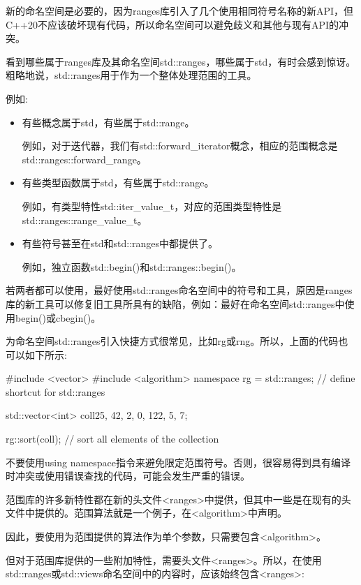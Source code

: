 新的命名空间是必要的，因为ranges库引入了几个使用相同符号名称的新API，但C++20不应该破坏现有代码，所以命名空间可以避免歧义和其他与现有API的冲突。

看到哪些属于ranges库及其命名空间std::ranges，哪些属于std，有时会感到惊讶。粗略地说，std::ranges用于作为一个整体处理范围的工具。

例如:

\begin{itemize}
\item
有些概念属于std，有些属于std::range。

例如，对于迭代器，我们有std::forward\_iterator概念，相应的范围概念是std::ranges::forward\_range。

\item
有些类型函数属于std，有些属于std::range。

例如，有类型特性std::iter\_value\_t，对应的范围类型特性是std::ranges::range\_value\_t。

\item
有些符号甚至在std和std::ranges中都提供了。

例如，独立函数std::begin()和std::ranges::begin()。
\end{itemize}

若两者都可以使用，最好使用std::ranges命名空间中的符号和工具，原因是ranges库的新工具可以修复旧工具所具有的缺陷，例如：最好在命名空间std::ranges中使用begin()或cbegin()。

为命名空间std::ranges引入快捷方式很常见，比如rg或rng。所以，上面的代码也可以如下所示:

\begin{cpp}
#include <vector>
#include <algorithm>
namespace rg = std::ranges; // define shortcut for std::ranges

std::vector<int> coll{25, 42, 2, 0, 122, 5, 7};

rg::sort(coll); // sort all elements of the collection
\end{cpp}

不要使用using namespace指令来避免限定范围符号。否则，很容易得到具有编译时冲突或使用错误查找的代码，可能会发生严重的错误。


范围库的许多新特性都在新的头文件<ranges>中提供，但其中一些是在现有的头文件中提供的。范围算法就是一个例子，在<algorithm>中声明。

因此，要使用为范围提供的算法作为单个参数，只需要包含<algorithm>。

但对于范围库提供的一些附加特性，需要头文件<ranges>。所以，在使用std::ranges或std::views命名空间中的内容时，应该始终包含<ranges>:

